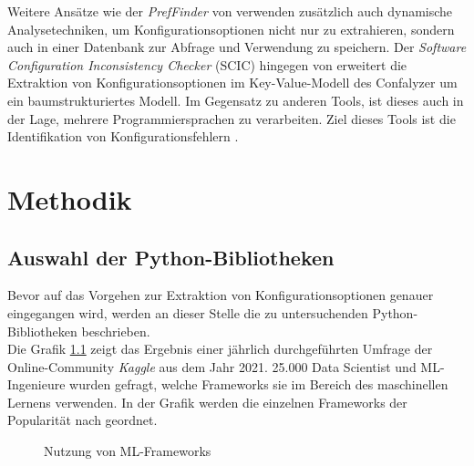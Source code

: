 \documentclass[german,bachelor]{swsLeipzig}
\begin{document}
\indent Weitere Ansätze wie der \textit{PrefFinder} von \citeauthor{10.1145/2642937.2643009} verwenden zusätzlich auch dynamische
Analysetechniken, um Konfigurationsoptionen nicht nur zu extrahieren, sondern auch in einer Datenbank zur Abfrage und
Verwendung zu speichern.
Der \textit{Software Configuration Inconsistency Checker} (SCIC) hingegen von \citeauthor{10.1145/2786805.2786869}
erweitert die Extraktion von Konfigurationsoptionen im Key-Value-Modell des Confalyzer um ein baumstrukturiertes Modell.
Im Gegensatz zu anderen Tools, ist dieses auch in der Lage, mehrere Programmiersprachen zu verarbeiten.
Ziel dieses Tools ist die Identifikation von Konfigurationsfehlern \cite[]{10.1145/2786805.2786869}.\\


\chapter{Methodik}\label{Methodik}


\section{Auswahl der Python-Bibliotheken}
Bevor auf das Vorgehen zur Extraktion von Konfigurationsoptionen genauer eingegangen wird, werden an dieser Stelle die
zu untersuchenden Python-Bibliotheken beschrieben. \\
\indent Die Grafik \ref{fig:kaggle} zeigt das Ergebnis einer jährlich durchgeführten Umfrage der Online-Community \textit{Kaggle}
aus dem Jahr 2021.
25.000 Data Scientist und ML-Ingenieure wurden gefragt, welche Frameworks sie im Bereich des maschinellen Lernens verwenden.
In der Grafik werden die einzelnen Frameworks der Popularität nach geordnet.\\

\begin{figure}[H]
\begin{center}
\caption{Nutzung von ML-Frameworks \cite[]{kaggle}} \label{fig:kaggle}
\end{center}
\end{figure}
\end{document}
